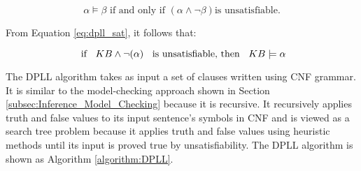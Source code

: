 \begin{equation}
	\alpha \models \beta \text{ if and only if } (\alpha \wedge \neg \beta) \text{is unsatisfiable.}
	\label{eq:dpll_sat}
\end{equation}

From Equation \ref{eq:dpll_sat}, it follows that:



\begin{equation}
\text{  if } \hspace{0.2cm} KB \wedge \neg (\alpha) \hspace{0.2cm} \text{  is unsatisfiable,  then  } \hspace{0.2cm} KB \models \alpha
\label{eq:sat}
\end{equation}



%

%

The DPLL algorithm takes as input a set of clauses written using CNF grammar. It is similar to the model-checking approach shown in Section \ref{subsec:Inference_Model_Checking} because it is recursive. It recursively applies truth and false values to its input sentence's symbols in CNF and is viewed as a search tree problem because it applies truth and false values using heuristic methods until its input is proved true by unsatisfiability.
The DPLL algorithm is shown as Algorithm \ref{algorithm:DPLL}.


